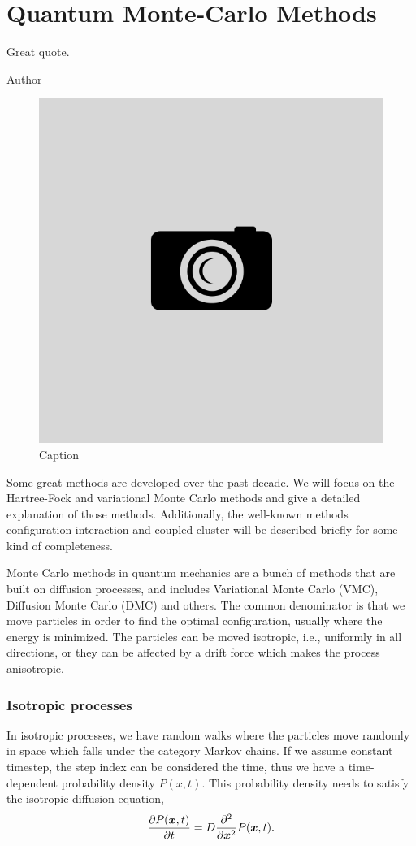\chapter{Quantum Monte-Carlo Methods} \label{chp:methods}
\epigraph{Great quote.}{Author}
\begin{figure}[H]
	\centering
	\includegraphics[scale=0.4]{Images/example.png}
	\caption{Caption}
\end{figure}

Some great methods are developed over the past decade. We will focus on the Hartree-Fock and variational Monte Carlo methods and give a detailed explanation of those methods. Additionally, the well-known methods configuration interaction and coupled cluster will be described briefly for some kind of completeness. 

Monte Carlo methods in quantum mechanics are a bunch of methods that are built on diffusion processes, and includes Variational Monte Carlo (VMC), Diffusion Monte Carlo (DMC) and others. The common denominator is that we move particles in order to find the optimal configuration, usually where the energy is minimized. The particles can be moved isotropic, i.e., uniformly in all directions, or they can be affected by a drift force which makes the process anisotropic. 

\subsection{Isotropic processes}
In isotropic processes, we have random walks where the particles move randomly in space which falls under the category Markov chains. If we assume constant timestep, the step index can be considered the time, thus we have a time-dependent probability density $P(x,t)$. This probability density needs to satisfy the isotropic diffusion equation,
\begin{equation}
\frac{\partial P(\boldsymbol{{x}},t)}{\partial t}=D\frac{\partial^2}{\partial \boldsymbol{{x}}^2}P(\boldsymbol{{x}},t).
\end{equation}

